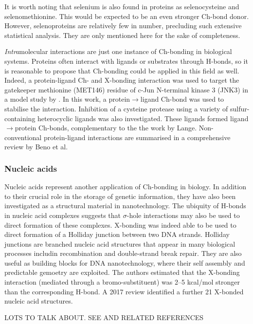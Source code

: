 \begin{refsection}
It is worth noting that selenium is also found in proteins as selenocysteine and selenomethionine.
This would be expected to be an even stronger Ch-bond donor.
However, selenoproteins are relatively few in number, precluding such extensive statistical analysis.\autocite{Iwaoka2015}
They are only mentioned here for the sake of completeness.

\emph{Intra}molecular interactions are just one instance of Ch-bonding in biological systems.
Proteins often interact with ligands or substrates through H-bonds, so it is reasonable to propose that Ch-bonding could be applied in this field as well.
Indeed, a protein-ligand Ch- and X-bonding interaction was used to target the gatekeeper methionine (MET146) residue of c-Jun N-terminal kinase 3 (JNK3) in a model study by \citeauthor{Lange2015}.\autocite{Lange2015}
In this work, a protein$\rightarrow$ligand Ch-bond was used to stabilise the interaction.
Inhibition of a cysteine protease using a variety of sulfur-containing heterocyclic ligands was also investigated.\autocite{Giroud2017}
These ligands formed ligand$\rightarrow$protein Ch-bonds, complementary to the the work by Lange.
Non-conventional protein-ligand interactions are summarised in a comprehensive review by Beno et al.\autocite{Beno2015}

\subsubsection{Nucleic acids}
Nucleic acids represent another application of Ch-bonding in biology.
In addition to their crucial role in the storage of genetic information, they have also been investigated as a structural material in nanotechnology.
The ubiquity of H-bonds in nucleic acid complexes suggests that $\sigma$-hole interactions may also be used to direct formation of these complexes.
X-bonding was indeed able to be used to direct formation of a Holliday junction between two DNA strands.\autocite{Voth2007}
Holliday junctions are branched nucleic acid structures that appear in many biological processes includin recombination and double-strand break repair.
They are also useful as building blocks for DNA nanotechnology, where their self assembly and predictable gemoetry are exploited.
The authors estimated that the X-bonding interaction (mediated through a bromo-substituent) was 2--5 kcal/mol stronger than the corresponding H-bond.
A 2017 review identified a further 21 X-bonded nucleic acid structures.\autocite{Kolar2017}

LOTS TO TALK ABOUT. SEE \cite{Sharma2020} AND RELATED REFERENCES \cite{Farrell2018,Mai2019,Peng2020,Fang2019,Uleany2020,Sun2012,Hassan2010,Vazquez-Mayagoitia2009,Salon2007,DeBoer2007,Sun2019,Faustino2014,Lee2015,Conlon2019,Parker2012}


\end{refsection}
